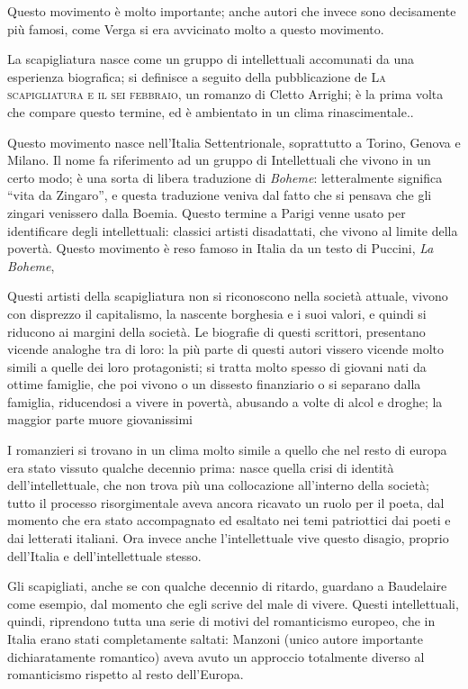 \documentclass{book}
\newcounter{mar}
\begin{document}
Questo movimento è molto importante; anche autori che invece sono
decisamente più famosi, come Verga si era avvicinato molto a questo
movimento.

La scapigliatura nasce come un gruppo di intellettuali accomunati da una
esperienza biografica; si definisce a seguito della pubblicazione de
\textsc{La scapigliatura e il sei febbraio}, un romanzo di Cletto Arrighi;
è la prima volta che compare questo termine, ed è ambientato in un clima
rinascimentale..

Questo movimento nasce nell'Italia Settentrionale, soprattutto a Torino,
Genova e Milano. Il nome fa riferimento ad un gruppo di Intellettuali
che vivono in un certo modo; è una sorta di libera traduzione di
\emph{Boheme}: letteralmente significa ``vita da Zingaro'', e questa
traduzione veniva dal fatto che si pensava che gli zingari venissero
dalla Boemia. Questo termine a Parigi venne usato per identificare degli
intellettuali: classici artisti disadattati, che vivono al limite della
povertà. Questo movimento è reso famoso in Italia da un testo di
Puccini, \emph{La Boheme},

Questi artisti della scapigliatura non si riconoscono nella società
attuale, vivono con disprezzo il capitalismo, la nascente borghesia e i
suoi valori, e quindi si riducono ai margini della società. Le biografie
di questi scrittori, presentano vicende analoghe tra di loro: la più
parte di questi autori vissero vicende molto simili a quelle dei loro
protagonisti; si tratta molto spesso di giovani nati da ottime famiglie,
che poi vivono o un dissesto finanziario o si separano dalla famiglia,
riducendosi a vivere in povertà, abusando a volte di alcol e droghe; la
maggior parte muore giovanissimi

I romanzieri si trovano in un clima molto simile a quello che nel resto
di europa era stato vissuto qualche decennio prima: nasce quella crisi
di identità dell'intellettuale, che non trova più una collocazione
all'interno della società; tutto il processo risorgimentale aveva ancora
ricavato un ruolo per il poeta, dal momento che era stato accompagnato
ed esaltato nei temi patriottici dai poeti e dai letterati italiani. Ora
invece anche l'intellettuale vive questo disagio, proprio dell'Italia e
dell'intellettuale stesso.

Gli scapigliati, anche se con qualche decennio di ritardo, guardano a
Baudelaire come esempio, dal momento che egli scrive del male di vivere.
Questi intellettuali, quindi, riprendono tutta una serie di motivi del
romanticismo europeo, che in Italia erano stati completamente saltati:
Manzoni (unico autore importante dichiaratamente romantico) aveva avuto
un approccio totalmente diverso al romanticismo rispetto al resto
dell'Europa.
\end{document}
